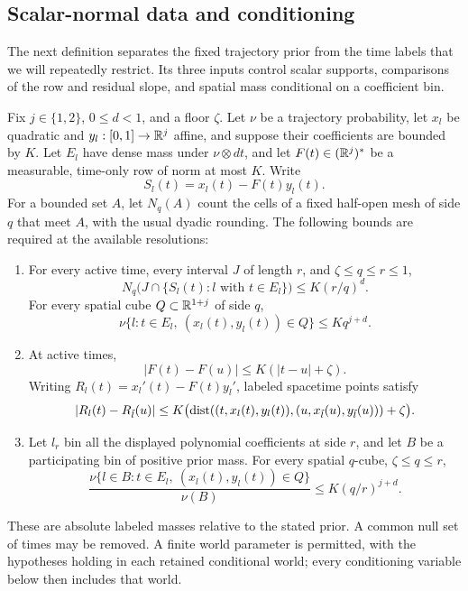 \subsection{Scalar-normal data and conditioning}

The next definition separates the fixed trajectory prior from the time
labels that we will repeatedly restrict.  Its three inputs control
scalar supports, comparisons of the row and residual slope, and spatial
mass conditional on a coefficient bin.

\begin{definition}\label{a04:scalar-data}
Fix \(j\in\{1,2\}\), \(0\le d<1\), and a floor \(\zeta\).
Let \(\nu\) be a trajectory probability, let \(x_l\) be quadratic and
\(y_l:[0,1]\to\mathbb R^j\) affine, and suppose their coefficients are bounded
by \(K\).  Let \(E_l\) have dense mass under \(\nu\otimes dt\), and let
\(F(t)\in(\mathbb R^j)^*\) be a measurable, time-only row of norm at most \(K\).
Write
\[
 S_l(t)=x_l(t)-F(t)y_l(t).
\]
For a bounded set \(A\), let \(N_q(A)\) count the cells of a fixed
half-open mesh of side \(q\) that meet \(A\), with the usual dyadic
rounding. The following bounds are required at the available resolutions:
\begin{enumerate}
\item For every active time, every interval \(J\) of length \(r\), and
\(\zeta\le q\le r\le1\),
\begin{equation}\label{a04:scalar-support}
 N_q\bigl(J\cap\{S_l(t):l\text{ with }t\in E_l\}\bigr)\le K(r/q)^d.
\end{equation}
For every spatial cube \(Q\subset\mathbb R^{1+j}\) of side \(q\),
\begin{equation}\label{a04:absolute-cap}
 \nu\{l:t\in E_l,\ (x_l(t),y_l(t))\in Q\}\le Kq^{j+d}.
\end{equation}
\item At active times,
\begin{equation}\label{a04:row-comparison}
 |F(t)-F(u)|\le K(|t-u|+\zeta).
\end{equation}
Writing \(R_l(t)=x_l'(t)-F(t)y_l'\), labeled spacetime points satisfy
\begin{equation}\label{a04:residual-comparison}
 |R_l(t)-R_{\tilde l}(u)|
 \le K\bigl(\operatorname{dist}((t,x_l(t),y_l(t)),
                  (u,x_{\tilde l}(u),y_{\tilde l}(u)))+\zeta\bigr).
\end{equation}
\item Let \(l_r\) bin all the displayed polynomial coefficients at side
\(r\), and let \(B\) be a participating bin of positive prior mass.
For every spatial \(q\)-cube, \(\zeta\le q\le r\),
\begin{equation}\label{a04:bin-cap}
 \frac{\nu\{l\in B:t\in E_l,\ (x_l(t),y_l(t))\in Q\}}{\nu(B)}
 \le K(q/r)^{j+d}.
\end{equation}
\end{enumerate}
These are absolute labeled masses relative to the stated prior.
A common null set of times may be removed.  A finite world parameter
is permitted, with the hypotheses holding in each retained conditional
world; every conditioning variable below then includes that world.
\end{definition}

